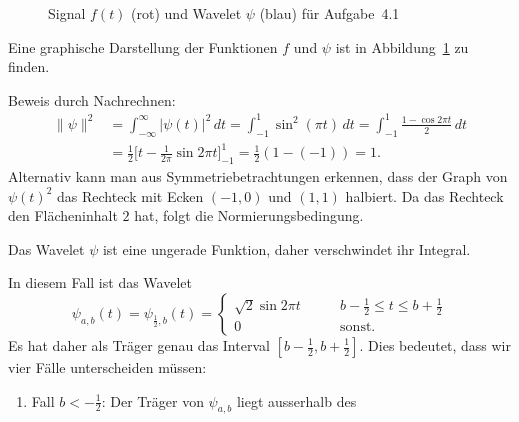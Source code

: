 \begin{loesung}
\begin{figure}
\caption{Signal $f(t)$ (rot) und Wavelet $\psi$ (blau) für Aufgabe~4.1
\label{04001:funktionen}}
\end{figure}
Eine graphische Darstellung der Funktionen $f$ und $\psi$ ist in
Abbildung~\ref{04001:funktionen} zu finden.
\begin{teilaufgaben}
%
%
\item
Beweis durch Nachrechnen:
\begin{align*}
\|\psi\|^2
&=
\int_{-\infty}^\infty |\psi(t)|^2\,dt
=
\int_{-1}^1 \sin^2(\pi t)\,dt
=
\int_{-1}^1 \frac{1-\cos 2\pi t}{2}\,dt
\\
&=
\frac12\biggl[
t-\frac{1}{2\pi}\sin 2\pi t
\biggr]_{-1}^{1}
=\frac12(1-(-1))
=
1.
\end{align*}
Alternativ kann man aus Symmetriebetrachtungen erkennen, dass der Graph
von $\psi(t)^2$ das Rechteck mit Ecken $(-1,0)$ und $(1,1)$ halbiert.
Da das Rechteck den Flächeninhalt $2$ hat, folgt die Normierungsbedingung.
%
%
\item
Das Wavelet $\psi$ ist eine ungerade Funktion, daher verschwindet ihr
Integral.
%
%
\item
In diesem Fall ist das Wavelet
\[
\psi_{a,b}(t)
=
\psi_{\frac12,b}(t)
=
\begin{cases}
\sqrt{2}\sin 2\pi t&\qquad b-\frac12\le t\le b+\frac12
\\
0&\qquad\text{sonst.}
\end{cases}
\]
Es hat daher als Träger genau das Interval $[b-\frac12,b+\frac12]$.
Dies bedeutet, dass wir vier Fälle unterscheiden müssen:
\begin{enumerate}
\item
Fall $b < -\frac12$:  Der Träger von $\psi_{a,b}$ liegt ausserhalb des

\end{enumerate}
\end{teilaufgaben}
\end{loesung}

